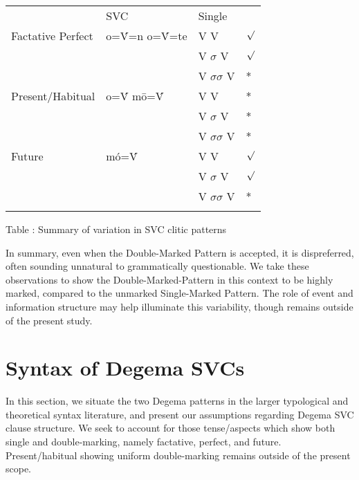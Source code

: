 \documentclass[output=paper]{langsci/langscibook}
\begin{document}
\begin{table}

\begin{tabularx}{\textwidth}{XXXX}
\lsptoprule

\multicolumn{2}{X}{} & {SVC } & {Single}\\
{Factative} {Perfect} & {o=\'{V}=n} {o=\'{V}=te} & {V V} & {${\surd}$}\\
\hhline{--~~} &  & {V $\sigma $ V} & {${\surd}$}\\
&  & {V $\sigma \sigma $ V} & {*}\\
{Present/Habitual} & {o=\'{V} m\={o}=\'{V}} & {V V} & {*}\\
&  & {V $\sigma $ V} & {*}\\
&  & {V $\sigma \sigma $ V} & {*}\\
{Future} & {mó=\'{V}} & {V V} & {${\surd}$}\\
\hhline{--~~} &  & {V $\sigma $ V} & {${\surd}$}\\
&  & {V $\sigma \sigma $ V} & {*}\\
\hhline{~~--}
\lspbottomrule
\end{tabularx}
\label{bkm:Ref448139790}Table : Summary of variation in SVC clitic patterns
\end{table}


In summary, even when the Double-Marked Pattern is accepted, it is dispreferred, often sounding unnatural to grammatically questionable. We take these observations to show the Double-Marked-Pattern in this context to be highly marked, compared to the unmarked Single-Marked Pattern. The role of event and information structure may help illuminate this variability, though remains outside of the present study.

\section{Syntax of Degema SVCs}

In this section, we situate the two Degema patterns in the larger typological and theoretical syntax literature, and present our assumptions regarding Degema SVC clause structure. We seek to account for those tense/aspects which show both single and double-marking, namely factative, perfect, and future. Present/habitual showing uniform double-marking remains outside of the present scope. 
\end{document}
